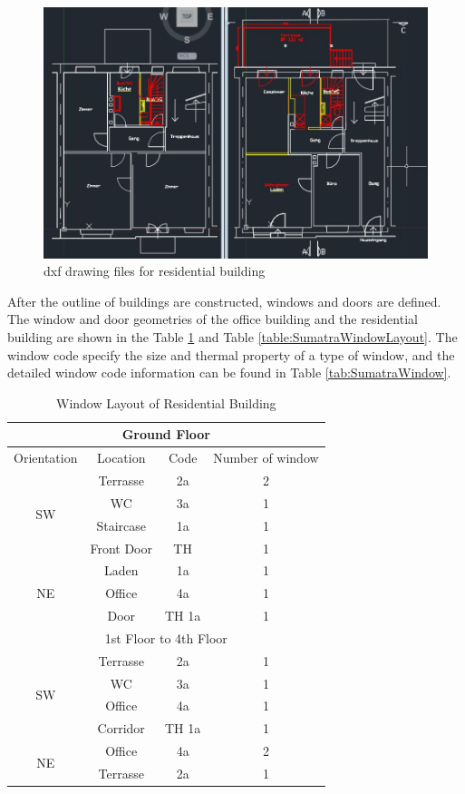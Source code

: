 \documentclass[a4paper, oneside]{discothesis}
\begin{document}
			\begin{figure}[H]
			\centering
			\includegraphics[scale=0.55]{Hongger_dxf.jpg}
			\caption{dxf drawing files for residential building}
			\label{fig:HonggerDxf}
			\end{figure}
			

			After the outline of buildings are constructed, windows and doors are defined. The window and door geometries of the office building and the residential building are shown in the Table \ref{table:HonggerWindowLayout} and Table \ref{table:SumatraWindowLayout}. The window code specify the size and thermal property of a type of window, and the detailed window code information can be found in Table \ref{tab:SumatraWindow}. \\

				\begin{table}[H]
				\centering
				\caption{Window Layout of Residential Building}
				\begin{tabular}{  c | c | c | c  }
					\hline
					\multicolumn{4}{c}{Ground Floor} \\ 
					\hline
					Orientation & Location & Code & Number of window \\ \hline
					\multirow{4}{*}{SW} & Terrasse & 2a & 2 \\ 
					 & WC & 3a & 1 \\ 
					 & Staircase & 1a & 1 \\ 
					 & Front Door & TH & 1 \\ \hline
					\multirow{3}{*}{NE} & Laden & 1a & 1 \\ 
					 & Office & 4a & 1 \\ 
					 & Door & TH 1a & 1 \\ \hline
					\multicolumn{4}{c}{1st Floor to 4th Floor}\\ \hline
					\multirow{4}{*}{SW} & Terrasse & 2a & 1 \\ 
					 & WC & 3a & 1 \\ 
					 & Office & 4a & 1 \\ 
					 & Corridor & TH 1a & 1 \\ \hline
					\multirow{2}{*}{NE} & Office & 4a & 2 \\ 
					 & Terrasse & 2a & 1 \\ 
					 \hline
				\end{tabular}
				\label{table:HonggerWindowLayout}
				\end{table}
\end{document}
